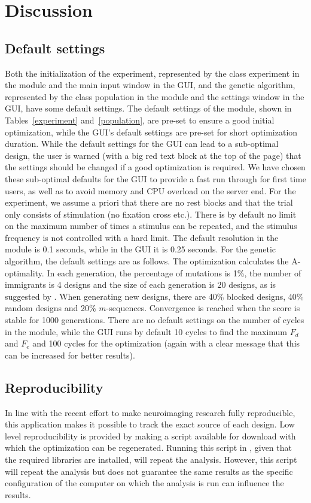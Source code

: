 \documentclass[article]{jss}
\begin{document}
\section{Discussion}\label{sec:discussion}

\subsection{Default settings}
Both the initialization of the experiment, represented by the class
experiment in the  module and the main input window
in the GUI, and the genetic algorithm, represented by the class
population in the  module and the settings window in
the GUI, have some default settings.  The default settings of the
 module, shown in Tables~\ref{experiment}
and~\ref{population}, are pre-set to ensure a good initial
optimization, while the GUI's default settings are pre-set for short
optimization duration.  While the default settings for the GUI can
lead to a sub-optimal design, the user is warned (with a big red
text block at the top of the page) that the settings should be changed
if a good optimization is required.  We have chosen these sub-optimal
defaults for the GUI to provide a fast run through for first time
users, as well as to avoid memory and CPU overload on the server end.
For the experiment, we assume a priori that there are no rest blocks
and that the trial only consists of stimulation (no fixation cross
etc.).  There is by default no limit on the maximum number of times a
stimulus can be repeated, and the stimulus frequency is not controlled
with a hard limit.  The default resolution in the 
module is 0.1 seconds, while in the GUI it is 0.25 seconds.  For the
genetic algorithm, the default settings are as follows.  The
optimization calculates the A-optimality.  In each generation, the
percentage of mutations is 1\%, the number of immigrants is 4 designs
and the size of each generation is 20 designs, as is suggested by
\citet{Kao2009}.  When generating new designs, there are 40\% blocked
designs, 40\% random designs and 20\% $m$-sequences.  Convergence is
reached when the score is stable for 1000 generations.  There are no
default settings on the number of cycles in the 
module, while the GUI runs by default 10 cycles to find the maximum
$F_d$ and $F_e$ and 100 cycles for the optimization (again with a
clear message that this can be increased for better results).


\subsection{Reproducibility}
In line with the recent effort to make neuroimaging research fully
reproducible, this application makes it possible to track the exact
source of each design.  Low level reproducibility is provided by
making a script available for download with which the optimization can
be regenerated.  Running this script in , given that
the required libraries are installed, will repeat the analysis.
However, this script will repeat the analysis but does not guarantee
the same results as the specific configuration of the computer on
which the analysis is run can influence the results.
\end{document}
